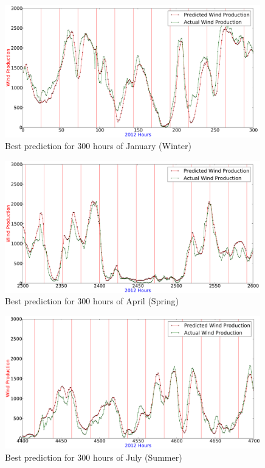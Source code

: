 \begin{figure}[H]
\centering
\includegraphics[width=0.99\textwidth]{billeder/bestPossiblePredictionWindProduction0-300.png}
\caption{Best prediction for 300 hours of January (Winter)}
\label{fig:bestWPPredictWinter}
\end{figure}

\begin{figure}[H]
\centering
\includegraphics[width=0.99\textwidth]{billeder/bestPossiblePredictionWindProduction2300-2600_April_Spring.png}
\caption{Best prediction for 300 hours of April (Spring)}
\label{fig:bestWPPredictSpring}
\end{figure}

\begin{figure}[H]
\centering
\includegraphics[width=0.99\textwidth]{billeder/bestPossiblePredictionWindProduction4400-4700-Summer.png}
\caption{Best prediction for 300 hours of July (Summer)}
\label{fig:bestPredictWPSummer}
\end{figure}

